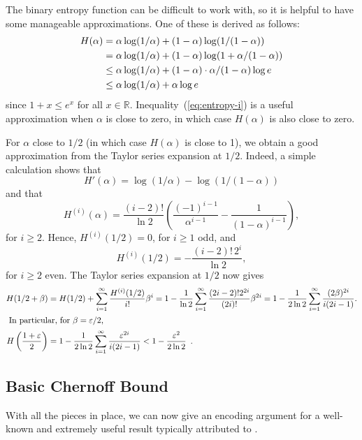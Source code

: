 \documentclass[format=acmsmall, review=false, screen=true]{acmart}
\begin{document}
The binary entropy function can be difficult to work with, so it is
helpful to have some manageable approximations.  One of these is
derived as follows:
\begin{align}
  H(\alpha) & = \alpha\log(1/\alpha) + (1-\alpha)\log(1/(1-\alpha)) 
      \notag \\
      & = \alpha\log(1/\alpha) + (1-\alpha)\log(1+\alpha/(1-\alpha)) 
      \notag \\
            & \le \alpha\log(1/\alpha) + (1-\alpha)\cdot 
            \alpha/(1-\alpha) \log e \notag \\
            & \le \alpha\log(1/\alpha) + \alpha\log e 
            \eqlabel{entropy-i} 
\end{align}
since $1+x\le e^x$ for all $x\in\mathbb{R}$. 
Inequality~(\ref{eq:entropy-i}) is a
useful approximation when $\alpha$ is close to zero, in which case 
$H(\alpha)$ is also close to zero.

For $\alpha$ close to $1/2$ (in which case $H(\alpha)$ is close to 1),
we obtain a good approximation from the Taylor series expansion at
$1/2$.  Indeed, a simple calculation shows that
\[
  H'(\alpha) = \log (1/\alpha) - \log (1/(1-\alpha))
\]
and that
\[
  H^{(i)}(\alpha) = \frac{(i-2)!}{\ln 2} \left( \frac{(-1)^{i-1}}{\alpha^{i-1}} - \frac{1}{(1-\alpha)^{i-1}}\right) ,
\]
for $i \geq 2$. Hence, $H^{(i)}(1/2) = 0$, for $i \geq 1$ odd, and
\[
  H^{(i)}(1/2) = -\frac{(i-2)!\, 2^i}{\ln 2}, 
\]
for $i \geq 2$ even. The Taylor series expansion at $1/2$ now gives
\begin{align}
  H(1/2 + \beta) &= 
  H(1/2) + \sum_{i = 1}^{\infty} \frac{H^{(i)}(1/2)}{i!}
     \beta^i \notag
 = 
1 - \frac{1}{\ln 2}\sum_{i = 1}^{\infty} \frac{(2i-2)! 2^{2i}}
{(2i)!}
     \beta^{2i}
= 1-\frac{1}{2\ln 2}\sum_{i=1}^{\infty}\frac{(2\beta)^{2i}}{i(2i-1)} .
              \notag \\ 
\intertext{ In particular, for $\beta=\eps/2$,}
H\left(\frac{1+\eps}{2}\right) & = 1-\frac{1}{2\ln 2}
\sum_{i=1}^{\infty}\frac{\eps^{2i}}{i(2i-1)} 
            < 1-\frac{\eps^2}{2\ln 2} \enspace .\eqlabel{entropy-ii}
\end{align}

\subsection{Basic Chernoff Bound}

With all the pieces in place, we can now give an encoding argument for
a well-known and extremely useful result typically attributed to
.
\end{document}
